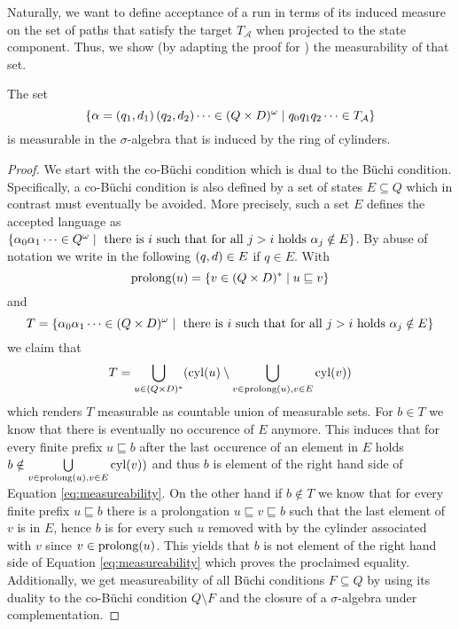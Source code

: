Naturally, we want to define acceptance of a run in terms of its induced
measure on the set of paths that satisfy the target $T_{\mathcal{A}}$ when
projected to the state component. Thus, we show (by adapting the proof for
\cite[Proposition 6]{RandAutoInfTrees}) the measurability of that set.
\begin{lemma}[Measurability]
  The set
  \begin{equation*}
    \left\{\alpha = \left(q_{1},d_{1}\right)\left(q_{2},d_{2}\right)\dots\in
    (Q\times D)^{\omega}\mid q_{0}q_{1}q_{2}\dots\in T_{\mathcal{A}}\right\}
  \end{equation*} is measurable in the $\sigma$-algebra that is induced by the
  ring of cylinders.
\end{lemma}
\begin{proof}
  We start with the co-Büchi condition which is dual to the Büchi condition.
  Specifically, a co-Büchi condition is also defined by a set of
  states $E\subseteq Q$ which in contrast must eventually be avoided. More
  precisely, such a set $E$ defines the accepted language as
  $\left\{\alpha_{0}\alpha_{1}\dots\in Q^{\omega}\mid\text{ there is } i
  \text{ such that for all } j>i \text{ holds }\alpha_{j}\notin E\right\}$.
  By abuse of notation we write in the following
  $\left(q, d\right)\in E$ if $q\in E$. With
  \begin{equation*}
    \operatorname{prolong}(u) = \left\{v\in (Q\times D)^{*}\mid u\sqsubseteq v\right\}
  \end{equation*} and
  \begin{equation*}
    T = \left\{\alpha_{0}\alpha_{1}\dots\in (Q\times D)^{\omega}\mid\text{ there
    is } i \text{ such that for all } j>i \text{ holds }\alpha_{j}\notin E\right\}
  \end{equation*}
  we claim that
  \begin{equation} 
    T = \bigcup\limits_{u\in (Q\times D)^{*}}(
    \operatorname{cyl}(u)\setminus\bigcup\limits_{v\in\operatorname{prolong}(u),v\in E}\operatorname{cyl}(v))
    \label{eq:measureability}
  \end{equation}
  which renders $T$ measurable as countable union of measurable sets.
  For $b\in T$ we know that there is eventually no occurence of $E$
  anymore. This induces that for every finite prefix $u\sqsubseteq b$ after the
  last occurence of an element in $E$ holds
  $b\notin\bigcup\limits_{v\in\operatorname{prolong}(u),v\in E}\operatorname{cyl}(v))$ and thus $b$
  is element of the right hand side of Equation \ref{eq:measureability}. On the
  other hand if $b\notin T$ we know that for every finite prefix
  $u\sqsubseteq b$ there is a prolongation $u\sqsubseteq v\sqsubseteq b$ such
  that the last element of $v$ is in $E$, hence $b$ is for every such $u$
  removed with by the cylinder associated with $v$ since $v\in\operatorname{prolong}(u)$.
  This yields that $b$ is not element of the right hand side of Equation
  \ref{eq:measureability} which proves the proclaimed equality. Additionally,
  we get measureability of all Büchi conditions $F\subseteq Q$ by using its
  duality to the co-Büchi condition $Q\setminus F$ and the closure of a
  $\sigma$-algebra under complementation.


\end{proof}
